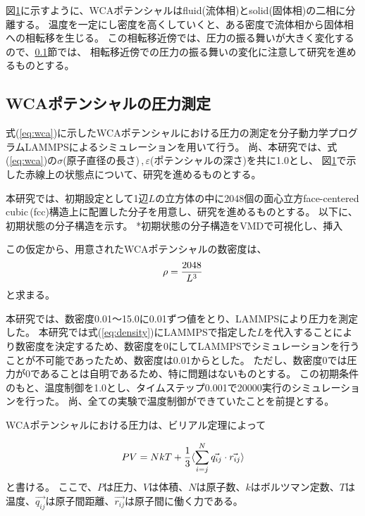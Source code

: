 \documentclass[titlepage]{jsreport}
\begin{document}
{{{\begin{figure}[htbp]
    \label{fig:wca-phase-diagram}
\end{figure}

図\ref{fig:wca-phase-diagram}に示すように、WCAポテンシャルはfluid(流体相)とsolid(固体相)の二相に分離する。
温度を一定にし密度を高くしていくと、ある密度で流体相から固体相への相転移を生じる。
この相転移近傍では、圧力の振る舞いが大きく変化するので、\ref{method-subsec:WCA-pressure}節では、
相転移近傍での圧力の振る舞いの変化に注意して研究を進めるものとする。


\subsection{WCAポテンシャルの圧力測定}\label{method-subsec:WCA-pressure}
式(\ref{eq:wca})に示したWCAポテンシャルにおける圧力の測定を分子動力学プログラムLAMMPS\cite{lammps}によるシミュレーションを用いて行う。
尚、本研究では、式(\ref{eq:wca})の${\sigma}$(原子直径の長さ)\,,\,${\varepsilon}$(ポテンシャルの深さ)を共に1.0とし、
図\ref{fig:wca-phase-diagram}で示した赤線上の状態点について、研究を進めるものとする。

本研究では、初期設定として1辺$L$の立方体の中に2048個の面心立方face-centered cubic\,(fcc)構造上に配置した分子を用意し、研究を進めるものとする。
以下に、初期状態の分子構造を示す。
*初期状態の分子構造をVMDで可視化し、挿入


この仮定から、用意されたWCAポテンシャルの数密度は、
\large
\begin{equation}
\rho = {\frac{2048}{L^3}}{\label{eq:density}}
\end{equation}
\normalsize
と求まる。

本研究では、数密度0.01〜15.0に0.01ずつ値をとり、LAMMPSにより圧力を測定した。
本研究では式(\ref{eq:density})にLAMMPSで指定した$L$を代入することにより数密度を決定するため、数密度を0にしてLAMMPSでシミュレーションを行うことが不可能であったため、数密度は0.01からとした。
ただし、数密度0では圧力が0であることは自明であるため、特に問題はないものとする。
この初期条件のもと、温度制御を1.0とし、タイムステップ0.001で20000実行のシミュレーションを行った。
尚、全ての実験で温度制御ができていたことを前提とする。

WCAポテンシャルにおける圧力は、ビリアル定理\cite{virial-therom}によって

\large
\begin{equation}
PV=NkT+{\frac{1}{3}}\langle\sum_{i=j}^N\vec{q_{ij}} \cdot \vec{r_{ij}}\rangle{\label{eq:Theoritical-pressure}}
\end{equation}
\normalsize
と書ける\cite{Theoritical-pressure}。
ここで、$P$は圧力、$V$は体積、$N$は原子数、$k$はボルツマン定数、$T$は温度、$\vec{q_{ij}}$は原子間距離、$\vec{r_{ij}}$は原子間に働く力である。

}}}
\end{document}
